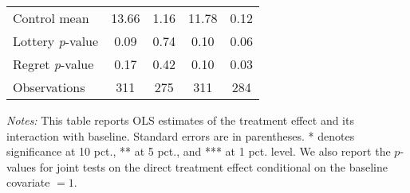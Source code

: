 \begin{table}[htbp]
{\begin{threeparttable}
\begin{tabular}{l*{4}{c}}
Control mean    &    13.66         &     1.16         &    11.78         &     0.12         \\
Lottery \emph{p}-value&     0.09         &     0.74         &     0.10         &     0.06         \\
Regret \emph{p}-value&     0.17         &     0.42         &     0.10         &     0.03         \\
Observations    &      311         &      275         &      311         &      284         \\
\bottomrule \end{tabular} \begin{tablenotes}[flushleft] \footnotesize \item \emph{Notes:} This table reports OLS estimates of the treatment effect and its interaction with baseline. Standard errors are in parentheses. * denotes significance at 10 pct., ** at 5 pct., and *** at 1 pct. level. We also report the \(p\)-values for joint tests on the direct treatment effect conditional on the baseline covariate $= 1$. \end{tablenotes} \end{threeparttable} } \end{table}
